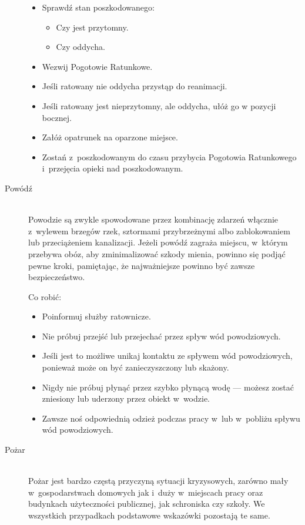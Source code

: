 \documentclass[a5paper,10pt,titlepage,twoside]{article}
\begin{document}
\begin{description}
\begin{itemize}
\item Sprawdź stan poszkodowanego:
\begin{itemize}
\item Czy jest przytomny.
\item Czy oddycha.
\end{itemize}
\item Wezwij Pogotowie Ratunkowe.
\item Jeśli ratowany nie oddycha przystąp do reanimacji.
\item Jeśli ratowany jest nieprzytomny, ale oddycha, ułóż go w pozycji bocznej.
\item Załóż opatrunek na oparzone miejsce.
\item Zostań z~poszkodowanym do czasu przybycia Pogotowia Ratunkowego i~przejęcia opieki nad poszkodowanym.
\end{itemize}
\item[Powódź] \hfill \\ Powodzie są zwykle spowodowane przez kombinację zdarzeń włącznie z~wylewem brzegów rzek, sztormami przybrzeżnymi albo zablokowaniem lub przeciążeniem kanalizacji. Jeżeli powódź zagraża miejscu, w~którym przebywa obóz, aby zminimalizować szkody mienia, powinno się podjąć pewne kroki, pamiętając, że najważniejsze powinno być zawsze bezpieczeństwo.

Co robić:
\begin{itemize}
\item Poinformuj służby ratownicze.
\item Nie próbuj przejść lub przejechać przez spływ wód powodziowych.
\item Jeśli jest to możliwe unikaj kontaktu ze spływem wód powodziowych, ponieważ może on być zanieczyszczony lub skażony.
\item Nigdy nie próbuj płynąć przez szybko płynącą wodę --- możesz zostać zniesiony lub uderzony przez obiekt w~wodzie.
\item Zawsze noś odpowiednią odzież podczas pracy w~lub w~pobliżu spływu wód powodziowych.
\end{itemize}
\item[Pożar] \hfill \\ Pożar jest bardzo częstą przyczyną sytuacji kryzysowych, zarówno mały w~gospodarstwach domowych jak i~duży w~miejscach pracy oraz budynkach użyteczności publicznej, jak schroniska czy szkoły. We wszystkich przypadkach podstawowe wskazówki pozostają te same.


\end{description}
\end{document}

